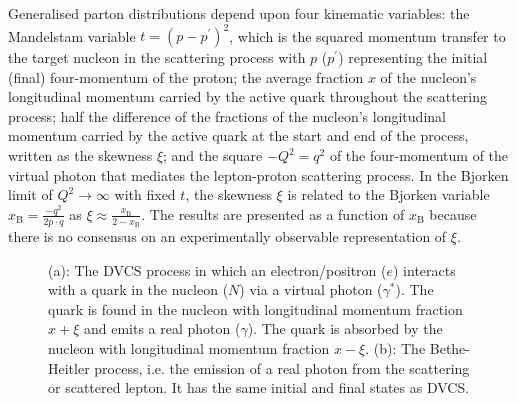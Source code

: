 Generalised parton distributions depend upon four kinematic variables: the
Mandelstam variable $t=(p-p^{\prime})^2$, which is the squared momentum
transfer to the target nucleon in the scattering process with $p$ ($p^{\prime}$)
representing the initial (final) four-momentum of the proton; the average
fraction $x$ of the nucleon's longitudinal momentum carried by the active
quark throughout the scattering process; half the difference of
  the fractions of the nucleon's longitudinal momentum carried
by the active quark at the start and end of the process, written as
the skewness $\xi$; and the square $-Q^2=q^2$ of the four-momentum of
the virtual photon that mediates the lepton-proton scattering
process. In the Bjorken limit of $Q^2\rightarrow\infty$ with fixed
$t$, the skewness $\xi$ is related to the Bjorken variable
$x_{\textrm{B}}=\frac{-q^2}{2p\cdot q}$ as
$\xi\approx\frac{x_\textrm{B}}{2-x_\textrm{B}}$. The results are presented
as a function of $x_{\textrm{B}}$ because there is no consensus on an experimentally observable representation of $\xi$. 
\begin{figure}
\begin{center}
\caption[DVCS and Bethe Heitler hand bag diagram.]{(a): The DVCS process in
which an electron/positron ($e$) interacts with a quark in the nucleon
($N$) via a virtual photon ($\gamma^\ast$). The quark is found in the
nucleon with longitudinal momentum fraction $x+\xi$ and emits a real
photon ($\gamma$). The quark is absorbed by the nucleon with
longitudinal momentum fraction
$x-\xi$. (b): The Bethe-Heitler process, i.e. the emission of a real photon from the scattering or
scattered lepton. It has the same initial and final states as DVCS.}
\label{spin}
\end{center}
\end{figure}


